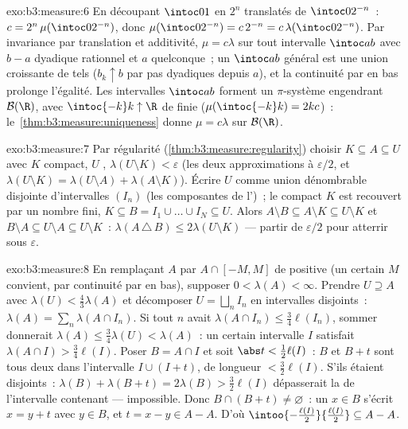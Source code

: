 \begin{solution}{exo:b3:measure:6}
En découpant $\intoc01$ en $2^n$ translatés de
$\intoc0{2^{-n}}$~: $c = 2^n\,\mu(\intoc0{2^{-n}})$, donc
$\mu(\intoc0{2^{-n}}) = c\,2^{-n} =
c\,\lambda(\intoc0{2^{-n}})$. Par invariance par translation
et additivité, $\mu = c\lambda$ sur tout intervalle $\intoc
ab$ avec $b - a$ dyadique rationnel et $a$ quelconque~; un
$\intoc ab$ général est une union croissante de tels ($b_k
\uparrow b$ par pas dyadiques depuis $a$), et la continuité
par en bas prolonge l'égalité. Les intervalles $\intoc ab$
forment un $\pi$-système engendrant $\mathcal B(\R)$, avec
$\intoc{-k}k \uparrow \R$ de  finie
($\mu(\intoc{-k}k) = 2kc$)~:
le~\cref{thm:b3:measure:uniqueness} donne $\mu = c\lambda$
sur $\mathcal B(\R)$.
\end{solution}

\begin{solution}{exo:b3:measure:7}
Par régularité (\cref{thm:b3:measure:regularity}) choisir $K
\subseteq A \subseteq U$ avec $K$ compact, $U$ ,
$\lambda(U\setminus K) < \varepsilon$ (les deux
approximations à $\varepsilon/2$, et $\lambda(U \setminus K)
= \lambda(U\setminus A) + \lambda(A \setminus K)$). Écrire
$U$ comme union dénombrable disjointe d'intervalles 
$(I_n)$ (les composantes de l')~; le compact $K$ est
recouvert par un nombre fini, $K \subseteq B =
I_1\cup\dots\cup I_N \subseteq U$. Alors $A \setminus B
\subseteq A\setminus K \subseteq U\setminus K$ et $B
\setminus A \subseteq U \setminus A \subseteq U\setminus K$~:
$\lambda(A\,\triangle\,B) \leq 2\lambda(U\setminus K)$ ---
partir de $\varepsilon/2$ pour atterrir sous $\varepsilon$.
\end{solution}

\begin{solution}{exo:b3:measure:8}
En remplaçant $A$ par $A \cap [-M, M]$ de  positive
(un certain $M$ convient, par continuité par en bas),
supposer $0 < \lambda(A) < \infty$. Prendre $U \supseteq A$
 avec $\lambda(U) < \frac43\lambda(A)$ et décomposer $U
= \bigsqcup_nI_n$ en intervalles  disjoints~:
$\lambda(A) = \sum_n\lambda(A\cap I_n)$. Si tout $n$ avait
$\lambda(A\cap I_n) \leq \frac34\ell(I_n)$, sommer
donnerait $\lambda(A) \leq \frac34\lambda(U) < \lambda(A)$~:
un certain intervalle $I$ satisfait $\lambda(A\cap I) >
\frac34\ell(I)$. Poser $B = A \cap I$ et soit $\abs t <
\frac12\ell(I)$~: $B$ et $B + t$ sont tous deux dans
l'intervalle $I \cup (I + t)$, de longueur $<
\frac32\ell(I)$. S'ils étaient disjoints~: $\lambda(B) +
\lambda(B + t) = 2\lambda(B) > \frac32\ell(I)$
dépasserait la  de l'intervalle contenant ---
impossible. Donc $B \cap (B + t) \neq \varnothing$~: un $x
\in B$ s'écrit $x = y + t$ avec $y \in B$, et $t = x - y \in
A - A$. D'où $\intoo{-\frac{\ell(I)}2}{\frac{\ell(I)}2}
\subseteq A - A$.
\end{solution}

